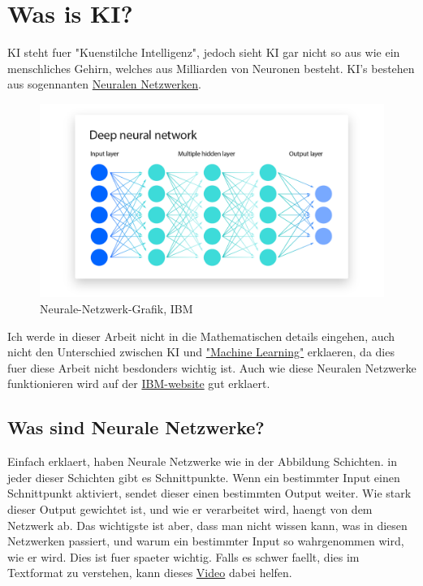 \documentclass{report}
\begin{document}
\section{Was is KI?}
KI steht fuer "Kuenstilche Intelligenz", jedoch sieht KI gar nicht so aus wie ein menschliches Gehirn, welches aus Milliarden von Neuronen besteht.
KI's bestehen aus sogennanten \hyperlink{https://www.ibm.com/topics/artificial-intelligence}{Neuralen Netzwerken}.
\begin{figure}[h]
    \centering 
    \includegraphics[width=1\textwidth]{NN-ibm.png} 
    \caption{Neurale-Netzwerk-Grafik, IBM}
    \label{fig:meme}
\end{figure}
\newline
Ich werde in dieser Arbeit nicht in die Mathematischen details eingehen, auch nicht den Unterschied zwischen KI und \hyperlink{https://www.ibm.com/topics/machine-learning}{"Machine Learning"} erklaeren, da dies fuer diese Arbeit nicht besdonders wichtig ist. Auch wie diese Neuralen Netzwerke funktionieren 
wird auf der \hyperlink{https://www.ibm.com/topics/neural-networks}{IBM-website} gut erklaert.
\subsection{Was sind Neurale Netzwerke?}
Einfach erklaert, haben Neurale Netzwerke wie in der Abbildung Schichten. in jeder dieser Schichten gibt es Schnittpunkte. Wenn ein bestimmter Input einen Schnittpunkt aktiviert, sendet dieser einen bestimmten Output weiter. Wie stark dieser Output gewichtet ist, und wie er verarbeitet wird, haengt von dem Netzwerk ab.
Das wichtigste ist aber, dass man nicht wissen kann, was in diesen Netzwerken passiert, und warum ein bestimmter Input so wahrgenommen wird, wie er wird. Dies ist fuer spaeter wichtig.
\newline
Falls es schwer faellt, dies im Textformat zu verstehen, kann dieses \hyperlink{https://youtube.com/watch?v=p6CfR3Wpz7Y&t=390}{Video} dabei helfen.
\end{document}
